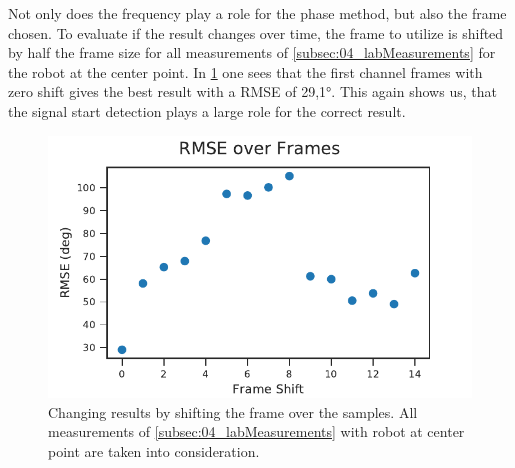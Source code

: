 Not only does the frequency play a role for the phase method,
but also the frame chosen.
To evaluate if the result changes over time, the frame to
utilize is shifted by half the frame size for all measurements
of \cref{subsec:04_labMeasurements} for the robot at the center
point.
In \cref{fig:04_phaseOverTime} one sees that the first channel frames
with zero shift gives the best result with a \ac{RMSE} of 29,1\si{\degree}.
This again shows us, that the signal start detection plays a
large role for the correct result.
\begin{figure}[ht]
	\centering
		\includegraphics[]{figures/evaluation/phase_over_time}
	\caption{Changing results by shifting the frame over the
	samples. All measurements of \cref{subsec:04_labMeasurements}
	with robot at center point are taken into consideration.}
	\label{fig:04_phaseOverTime}
\end{figure}
